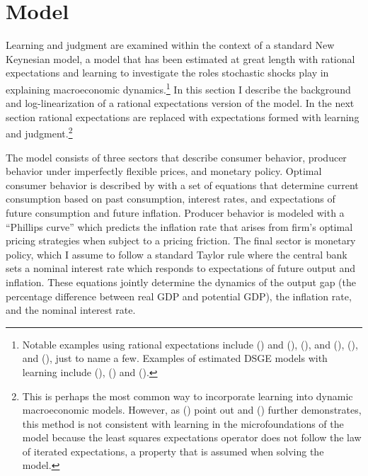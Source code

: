 \documentclass[10pt]{article}
\newcommand{\citee}[1]{\citeauthor*{#1} (\citeyear{#1})}
\begin{document}
\section{Model}\label{s:nk}
Learning and judgment are examined within the context of a standard New Keynesian model, a model that has been estimated at great length with rational expectations and learning to investigate the roles stochastic shocks play in explaining macroeconomic dynamics.\footnote{Notable examples using rational expectations include \citee{ireland2004} and (\citeyear{ireland_tech_2004}), \citee{nasonsmith2005}, and \citee{smetswouters2003}, (\citeyear{smetswouters2005}), and (\citeyear{smetswouters2007}), just to name a few.  Examples of estimated DSGE models with learning include \citee{milani2007}, \citee{slobodyan_wouters_2007} and (\citeyear{slobodyan_wouters_2008}).}  In this section I describe the background and log-linearization of a rational expectations version of the model.  In the next section rational expectations are replaced with expectations formed with learning and judgment.\footnote{This is perhaps the most common way to incorporate learning into dynamic macroeconomic models.  However, as \citee{marcetsargent1989} point out and \citee{preston2005} further demonstrates, this method is not consistent with learning in the microfoundations of the model because the least squares expectations operator does not follow the law of iterated expectations, a property that is assumed when solving the model.}

The model consists of three sectors that describe consumer behavior, producer behavior under imperfectly flexible prices, and monetary policy.  Optimal consumer behavior is described by with a set of equations that determine current consumption based on past consumption, interest rates, and expectations of future consumption and future inflation.  Producer behavior is modeled with a ``Phillips curve'' which predicts the inflation rate that arises from firm's optimal pricing strategies when subject to a pricing friction.  The final sector is monetary policy, which I assume to follow a standard Taylor rule where the central bank sets a nominal interest rate which responds to expectations of future output and inflation.  These equations jointly determine the dynamics of the output gap (the percentage difference between real GDP and potential GDP), the inflation rate, and the nominal interest rate.  
\end{document}

